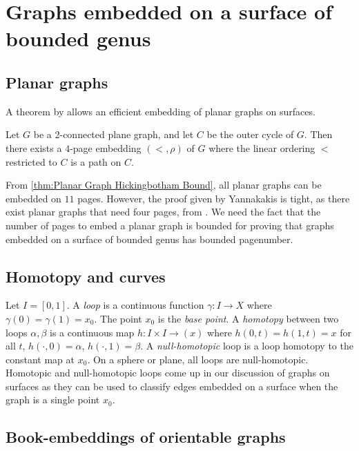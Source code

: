 
\section{Graphs embedded on a surface of bounded genus}\label{sec:pagenumber_bounded_genus}

\subsection{Planar graphs}\label{ssec:Planar_Graphs}
A theorem by \textcite{yannakakisEmbeddingPlanarGraphs1989} allows an efficient embedding of planar graphs on surfaces.
\begin{theorem}\label{thm:4Pages_Planar}
	Let $G$ be a 2-connected plane graph, and let $C$ be the outer cycle of $G$. Then there exists a $4$-page embedding $(<, \rho)$ of $G$ where the linear ordering $<$ restricted to $C$ is a path on $C$. 
\end{theorem}

From \cref{thm:Planar Graph Hickingbotham Bound}, all planar graphs can be embedded on $11$ pages. However, the proof given by Yannakakis is tight, as there exist planar graphs that need four pages, from \textcite{yannakakisPlanarGraphsThat2020, kaufmannFourPagesAre2020}. We need the fact that the number of pages to embed a planar graph is bounded for proving that graphs embedded on a surface of bounded genus has bounded pagenumber.

\subsection{Homotopy and curves}

Let $I = [0, 1]$.
A \textit{loop} is a continuous function $\gamma : I \rightarrow X$ where $\gamma(0) = \gamma(1) = x_0$. The point $x_0$ is the \textit{base point}. A \textit{homotopy} between two loops $\alpha, \beta$ is a continuous map $h : I \times I \rightarrow (x)$ where $h(0, t) = h(1, t) = x$ for all $t$, $h(\cdot, 0) = \alpha$, $h(\cdot, 1) = \beta$. A \textit{null-homotopic} loop is a loop homotopy to the constant map at $x_0$. On a sphere or plane, all loops are null-homotopic.               Homotopic and null-homotopic loops come up in our discussion of graphs on surfaces as they can be used to classify edges embedded on a surface when the graph is a single point $x_0$. 

\subsection{Book-embeddings of orientable graphs}

